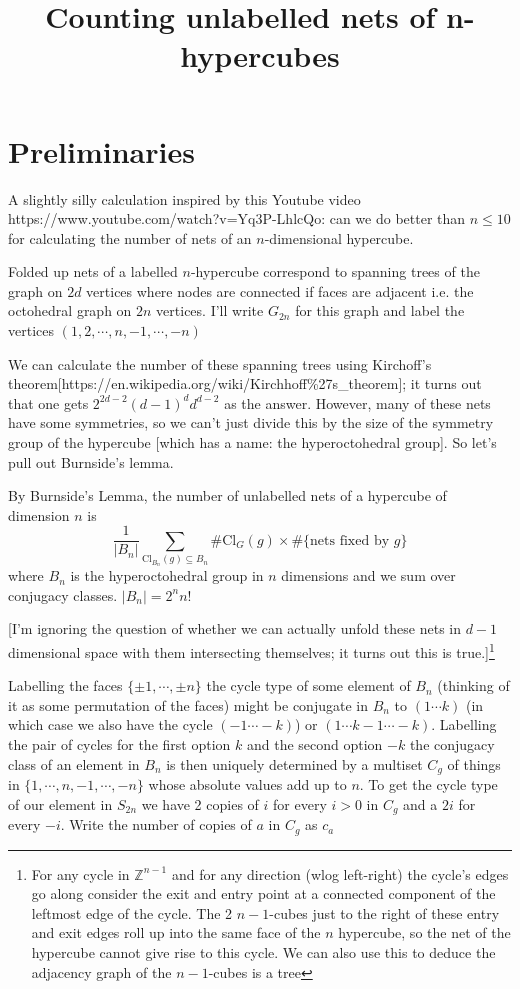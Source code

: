\documentclass[10pt]{article}
\newcommand{\Z}{\mathbb{Z}}
\newcommand{\Cl}{\text{Cl}}
\begin{document}
\title{Counting unlabelled nets of n-hypercubes}
\maketitle

\section{Preliminaries}

A slightly silly calculation inspired by this Youtube video https://www.youtube.com/watch?v=Yq3P-LhlcQo: can we do better than $n \le 10$ for calculating the number of nets of an $n$-dimensional hypercube.

Folded up nets of a labelled $n$-hypercube correspond to spanning trees of the graph on $2d$ vertices where nodes are connected if faces are adjacent i.e. the  octohedral graph on $2n$ vertices. I'll write $G_{2n}$ for this graph and label the  vertices $(1,2,\cdots,n,-1,\cdots,-n)$


We can calculate the number of these spanning trees using Kirchoff's theorem[https://en.wikipedia.org/wiki/Kirchhoff\%27s\_theorem]; it turns out that one gets $2^{2d-2}(d-1)^dd^{d-2}$ as the answer. However, many of these nets have some symmetries, so we can't just divide this by the size of the symmetry group of the hypercube [which has a name: the hyperoctohedral group]. So let's pull out Burnside's lemma.

By Burnside's Lemma, the number of unlabelled nets of a hypercube of dimension $n$ is
  \[\frac{1}{|B_n|}\sum_{\Cl_{B_n}(g)\subseteq B_n}\#\Cl_G(g)\times \#\text{\{nets fixed by $g$\}}\]
  where $B_n$ is the hyperoctohedral group in $n$ dimensions and we sum over conjugacy classes. $|B_n|= 2^nn!$

  [I'm ignoring the question of whether we can actually unfold these nets in $d-1$ dimensional space with them intersecting themselves; it turns out this is true.]\footnote{For any cycle in $\Z^{n-1}$ and for any direction (wlog left-right) the cycle's edges go along consider the exit and entry point at a connected component of the leftmost edge of the cycle. The 2 $n-1$-cubes just to the right of these entry and exit edges roll up into the same face of the $n$ hypercube, so the net of the hypercube cannot give rise to this cycle. We can also use this to deduce the adjacency graph of the $n-1$-cubes is a tree}
 
 
  Labelling the faces $\{\pm 1, \cdots,\pm n\}$ the cycle type of some element of $B_n$ (thinking of it as some permutation of the faces) might be conjugate in $B_n$ to $(1 \cdots k)$ (in which case we also have the cycle $(-1 \cdots -k)$) or $(1 \cdots k -1 \cdots-k)$. Labelling the pair of cycles for the first option $k$ and the second option $-k$ the conjugacy class of an element in $B_n$ is then uniquely determined by a multiset $C_g$ of things in $\{1, \cdots, n,-1,\cdots,-n\}$ whose absolute values add up to $n$. To get the cycle type of our element in $S_{2n}$ we have 2 copies of $i$ for every $i>0$ in $C_g$ and a $2i$ for every $-i$.
  Write the number of copies of $a$ in $C_g$ as $c_a$
\end{document}
